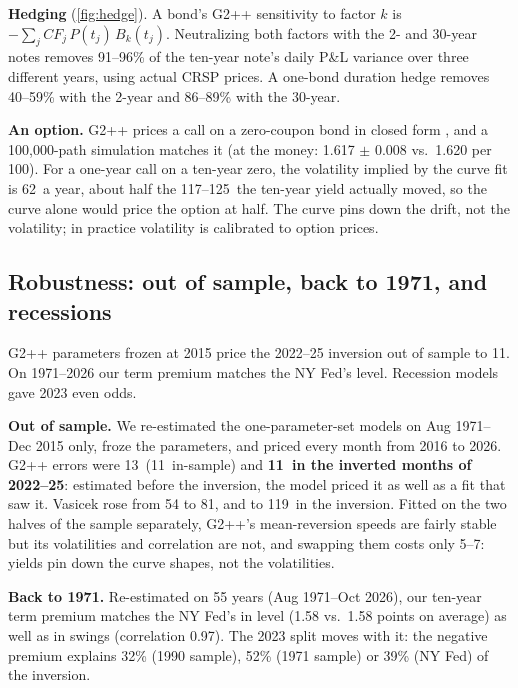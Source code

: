 \textbf{Hedging} (\cref{fig:hedge}). A bond's G2++ sensitivity to factor $k$ is $-\sum_j CF_j\,P(t_j)\,B_k(t_j)$. Neutralizing both factors with the 2- and 30-year notes removes 91--96\% of the ten-year note's daily P\&L variance over three different years, using actual CRSP prices. A one-bond duration hedge removes 40--59\% with the 2-year and 86--89\% with the 30-year.

\textbf{An option.} G2++ prices a call on a zero-coupon bond in closed form \citep{brigo2006}, and a 100,000-path simulation matches it (at the money: 1.617 $\pm$ 0.008 vs.\ 1.620 per 100). For a one-year call on a ten-year zero, the volatility implied by the curve fit is 62\bp\ a year, about half the 117--125\bp\ the ten-year yield actually moved, so the curve alone would price the option at half. The curve pins down the drift, not the volatility; in practice volatility is calibrated to option prices.

\subsection{Robustness: out of sample, back to 1971, and recessions}

\begin{takeaway}
G2++ parameters frozen at 2015 price the 2022--25 inversion out of sample to 11\bp. On 1971--2026 our term premium matches the NY Fed's level. Recession models gave 2023 even odds.
\end{takeaway}

\textbf{Out of sample.} We re-estimated the one-parameter-set models on Aug 1971--Dec 2015 only, froze the parameters, and priced every month from 2016 to 2026. G2++ errors were 13\bp\ (11\bp\ in-sample) and \textbf{11\bp\ in the inverted months of 2022--25}: estimated before the inversion, the model priced it as well as a fit that saw it. Vasicek rose from 54 to 81\bp, and to 119\bp\ in the inversion. Fitted on the two halves of the sample separately, G2++'s mean-reversion speeds are fairly stable but its volatilities and correlation are not, and swapping them costs only 5--7\bp: yields pin down the curve shapes, not the volatilities.

\textbf{Back to 1971.} Re-estimated on 55 years (Aug 1971--Oct 2026), our ten-year term premium matches the NY Fed's in level (1.58 vs.\ 1.58 points on average) as well as in swings (correlation 0.97). The 2023 split moves with it: the negative premium explains 32\% (1990 sample), 52\% (1971 sample) or 39\% (NY Fed) of the inversion.

